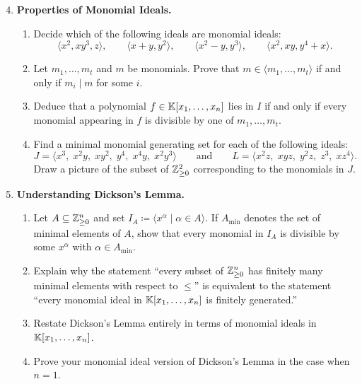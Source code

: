 \documentclass[12pt,reqno]{amsart}
\begin{document}
\begin{enumerate}[leftmargin=*]
\setcounter{enumi}{3}

\item \textbf{Properties of Monomial Ideals.}
\begin{enumerate}[label=(\alph*),ref=\theenumi\alph*]
    \item Decide which of the following ideals are monomial ideals:
    \[
    \langle x^2,xy^3,z\rangle,\qquad \langle x+y,y^2\rangle,\qquad \langle x^2-y,y^3\rangle,\qquad \langle x^2,xy,y^4+x\rangle.
    \]
    
    \item Let $m_1,\ldots,m_t$ and $m$ be monomials. Prove that $m\in \langle m_1,\ldots,m_t\rangle $ if and only if $m_i\mid m$ for some $i$.
    
    \item Deduce that a polynomial $f\in \mathbb{K}[x_1,\ldots,x_n]$ lies in $I$ if and only if every monomial appearing in $f$ is divisible by one of $m_1,\ldots,m_t$.
    
    \item Find a minimal monomial generating set for each of the following ideals:
    \[
    J=\langle x^3,\; x^2y,\; xy^2,\; y^4,\; x^4y,\; x^2y^3\rangle \quad \quad \text{and} \quad \quad 
    L=\langle x^2z,\; xyz,\; y^2z,\; z^3,\; xz^4\rangle.
    \]
    Draw a picture of the subset of $\mathbb{Z}^{2}_{\geq0}$ corresponding to the monomials in $J$. 
\end{enumerate}

\item \textbf{Understanding Dickson's Lemma.}
\begin{enumerate}[label=(\alph*),ref=\theenumi\alph*]
    \item Let $A\subseteq \mathbb{Z}_{\geq0}^n$ and set $I_A\coloneqq \langle x^\alpha\; | \; \alpha\in A\rangle$. If $A_{\min}$ denotes the set of minimal elements of $A$, show that every monomial in $I_A$ is divisible by some $x^\alpha$ with $\alpha\in A_{\min}$.
    
    \item Explain why the statement ``every subset of $\mathbb{Z}_{\geq0}^n$ has finitely many minimal elements with respect to $\leq$'' is equivalent to the statement ``every monomial ideal in $\mathbb{K}[x_1,\ldots,x_n]$ is finitely generated.''
  
	\item Restate Dickson's Lemma entirely in terms of monomial ideals in $\mathbb{K}[x_1,\ldots,x_n]$.
  
  \item\label{ex-pt:dickson-n-1} Prove your monomial ideal version of Dickson's Lemma in the case when $n=1$. 
  \end{enumerate}


\end{enumerate}
\end{document}
